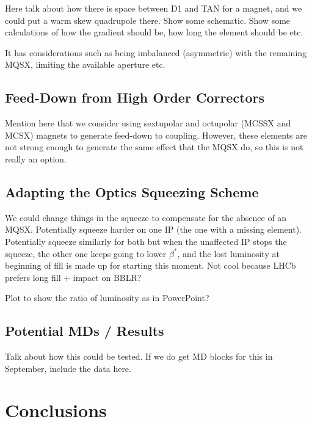 Here talk about how there is space between D1 and TAN for a magnet, and we could put a warm skew quadrupole there.
Show some schematic.
Show some calculations of how the gradient should be, how long the element should be etc.

It has considerations such as being imbalanced (asymmetric) with the remaining MQSX, limiting the available aperture etc.

\subsection{Feed-Down from High Order Correctors}

Mention here that we consider using sextupolar and octupolar (MCSSX and MCSX) magnets to generate feed-down to coupling.
However, these elements are not strong enough to generate the same effect that the MQSX do, so this is not really an option.

\subsection{Adapting the Optics Squeezing Scheme}

We could change things in the squeeze to compensate for the absence of an MQSX.
Potentially squeeze harder on one IP (the one with a missing element).
Potentially squeeze similarly for both but when the unaffected IP stops the squeeze, the other one keeps going to lower $\beta^{*}$, and the lost luminosity at beginning of fill is made up for starting this moment.
Not cool because LHCb prefers long fill + impact on BBLR?

Plot to show the ratio of luminosity as in PowerPoint?

\subsection{Potential MDs / Results}

Talk about how this could be tested.
If we do get MD blocks for this in September, include the data here.


\section{Conclusions}

